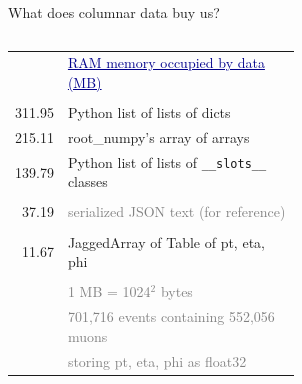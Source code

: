 \documentclass[aspectratio=169]{beamer}
\begin{document}
\begin{frame}{What does columnar data buy us?}
\vspace{0.5 cm}
\scriptsize

\begin{columns}
\begin{columns}
\begin{tabular}{r p{0.9\linewidth}}
& \textcolor{darkblue}{\small\underline{RAM memory occupied by data (MB)}} \\
& \\
311.95 & \textcolor{pythoncolor}{Python list of lists of dicts} \\
215.11 & \textcolor{rootnpcolor}{root\_numpy's array of arrays} \\
139.79 & \textcolor{pythoncolor}{Python list of lists of {\tt\scriptsize \_\_slots\_\_} classes} \\
& \\
 37.19 & \textcolor{gray}{serialized JSON text (for reference)} \\
& \\
 11.67 & \textcolor{mycolor}{JaggedArray of Table of pt, eta, phi} \\
& \\
& \textcolor{gray}{\scriptsize 1 MB = 1024$^2$ bytes} \\
& \textcolor{gray}{\scriptsize 701,716 events containing 552,056 muons} \\
& \textcolor{gray}{\scriptsize storing pt, eta, phi as float32} \\
\end{tabular}

\vspace{1.67 cm}


\end{columns}
\end{columns}
\end{frame}
\end{document}
